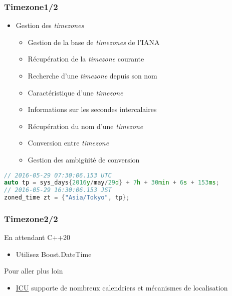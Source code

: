\documentclass[C++.tex]{subfiles}
\begin{document}
\begin{frame}[fragile]
	\frametitle{Timezone\titlehfill{}1/2}
	\begin{itemize}
		\item Gestion des \textit{timezones}
		\begin{itemize}
			\item Gestion de la base de \textit{timezones} de l'IANA


			\item Récupération de la \textit{timezone} courante
			\item Recherche d'une \textit{timezone} depuis son nom
			\item Caractéristique d'une \textit{timezone}
			\item Informations sur les secondes intercalaires
			\item Récupération du nom d'une \textit{timezone}
			\item Conversion entre \textit{timezone}
			\item Gestion des ambigüité de conversion
		\end{itemize}
	\end{itemize}

	\begin{lstlisting}[language=C++]
// 2016-05-29 07:30:06.153 UTC
auto tp = sys_days{2016y/may/29d} + 7h + 30min + 6s + 153ms; 
// 2016-05-29 16:30:06.153 JST
zoned_time zt = {"Asia/Tokyo", tp};\end{lstlisting}
\end{frame}

\begin{frame}[fragile]
	\frametitle{Timezone\titlehfill{}2/2}
	\begin{block}{En attendant C++20}
		\begin{itemize}
			\item Utilisez Boost.DateTime
		\end{itemize}
	\end{block}

	\begin{block}{Pour aller plus loin}
		\begin{itemize}
			\item \href{http://site.icu-project.org/home}{ICU} supporte de nombreux calendriers et mécanismes de localisation
		\end{itemize}

	\end{block}
\end{frame}
\end{document}
